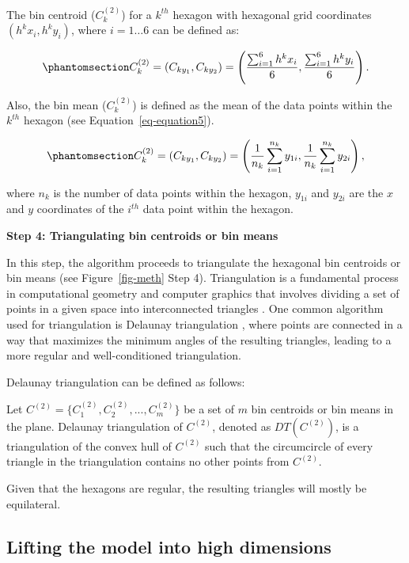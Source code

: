 \documentclass[
  12pt]{article}
\begin{document}
The bin centroid (\(C_k^{(2)}\)) for a \(k^{th}\) hexagon with hexagonal
grid coordinates \((h^{k}x_{i}, h^{k}y_{i})\), where \(i = 1 \dots 6\)
can be defined as:

\begin{equation}\phantomsection\label{eq-equation4}{
C_k^{(2)} = (C_{ky_1}, C_{ky_2}) = \left(\frac{\sum_{i=1}^{6} h^{k}x_{i}}{6}, \frac{\sum_{i=1}^{6} h^{k}y_{i}}{6}\right).
}\end{equation}

Also, the bin mean (\(C_k^{(2)}\)) is defined as the mean of the data
points within the \(k^{th}\) hexagon (see Equation~\ref{eq-equation5}).

\begin{equation}\phantomsection\label{eq-equation5}{
C_k^{(2)} = (C_{ky_1}, C_{ky_2}) = \left(\frac{1}{n_k} \sum_{i=1}^{n_k} y_{1i}, \frac{1}{n_k} \sum_{i=1}^{n_k} y_{2i}\right),
}\end{equation}

where \(n_k\) is the number of data points within the hexagon,
\(y_{1i}\) and \(y_{2i}\) are the \(x\) and \(y\) coordinates of the
\(i^{th}\) data point within the hexagon.

\textbf{Step 4: Triangulating bin centroids or bin means}

In this step, the algorithm proceeds to triangulate the hexagonal bin
centroids or bin means (see Figure~\ref{fig-meth} Step 4). Triangulation
is a fundamental process in computational geometry and computer graphics
that involves dividing a set of points in a given space into
interconnected triangles \citep{article30}. One common algorithm used
for triangulation is Delaunay triangulation
\citep[\citet{article54}]{article26}, where points are connected in a
way that maximizes the minimum angles of the resulting triangles,
leading to a more regular and well-conditioned triangulation.

Delaunay triangulation can be defined as follows:

Let \(C^{(2)} = \{C_1^{(2)}, C_2^{(2)}, ..., C_m^{(2)}\}\) be a set of
\(m\) bin centroids or bin means in the plane. Delaunay triangulation of
\(C^{(2)}\), denoted as \(DT(C^{(2)})\), is a triangulation of the
convex hull of \(C^{(2)}\) such that the circumcircle of every triangle
in the triangulation contains no other points from \(C^{(2)}\).

Given that the hexagons are regular, the resulting triangles will mostly
be equilateral.

\subsection{Lifting the model into high
dimensions}\label{lifting-the-model-into-high-dimensions}
\end{document}
